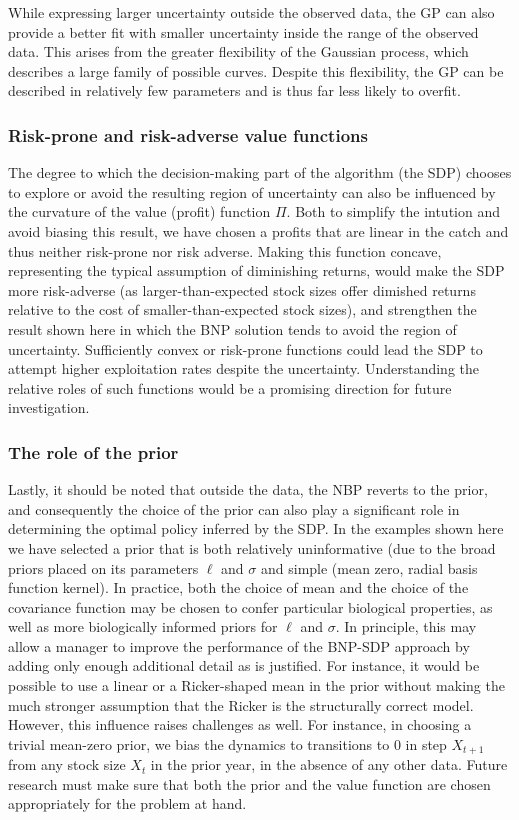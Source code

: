 \documentclass[author-year, review]{elsarticle} %
\begin{document}
While expressing larger uncertainty outside the observed data, the GP
can also provide a better fit with smaller uncertainty inside the range
of the observed data. This arises from the greater flexibility of the
Gaussian process, which describes a large family of possible curves.
Despite this flexibility, the GP can be described in relatively few
parameters and is thus far less likely to overfit.

\subsubsection{Risk-prone and risk-adverse value
functions}\label{risk-prone-and-risk-adverse-value-functions}

The degree to which the decision-making part of the algorithm (the SDP)
chooses to explore or avoid the resulting region of uncertainty can also
be influenced by the curvature of the value (profit) function $\Pi$.
Both to simplify the intution and avoid biasing this result, we have
chosen a profits that are linear in the catch and thus neither
risk-prone nor risk adverse. Making this function concave, representing
the typical assumption of diminishing returns, would make the SDP more
risk-adverse (as larger-than-expected stock sizes offer dimished returns
relative to the cost of smaller-than-expected stock sizes), and
strengthen the result shown here in which the BNP solution tends to
avoid the region of uncertainty. Sufficiently convex or risk-prone
functions could lead the SDP to attempt higher exploitation rates
despite the uncertainty. Understanding the relative roles of such
functions would be a promising direction for future investigation.

\subsubsection{The role of the prior}\label{the-role-of-the-prior}

Lastly, it should be noted that outside the data, the NBP reverts to the
prior, and consequently the choice of the prior can also play a
significant role in determining the optimal policy inferred by the SDP.
In the examples shown here we have selected a prior that is both
relatively uninformative (due to the broad priors placed on its
parameters $\ell$ and $\sigma$ and simple (mean zero, radial basis
function kernel). In practice, both the choice of mean and the choice of
the covariance function may be chosen to confer particular biological
properties, as well as more biologically informed priors for $\ell$ and
$\sigma$. In principle, this may allow a manager to improve the
performance of the BNP-SDP approach by adding only enough additional
detail as is justified. For instance, it would be possible to use a
linear or a Ricker-shaped mean in the prior without making the much
stronger assumption that the Ricker is the structurally correct model.
However, this influence raises challenges as well. For instance, in
choosing a trivial mean-zero prior, we bias the dynamics to transitions
to 0 in step $X_{t+1}$ from any stock size $X_t$ in the prior year, in
the absence of any other data. Future research must make sure that both
the prior and the value function are chosen appropriately for the
problem at hand.
\end{document}
